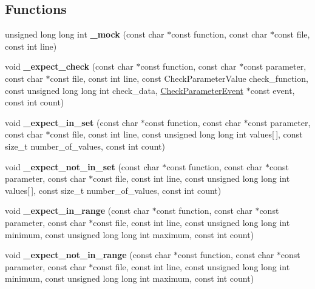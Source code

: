 \subsection*{Functions}
\begin{DoxyCompactItemize}
\item 
\mbox{\label{group__cmocka_ga80c706050fc2d841dbc8551b432c13a4}} 
unsigned long long int {\bfseries \+\_\+mock} (const char $\ast$const function, const char $\ast$const file, const int line)
\item 
\mbox{\label{group__cmocka_gaeeca1a8b7e109e06eaa43df8ee4c81f6}} 
void {\bfseries \+\_\+expect\+\_\+check} (const char $\ast$const function, const char $\ast$const parameter, const char $\ast$const file, const int line, const Check\+Parameter\+Value check\+\_\+function, const unsigned long long int check\+\_\+data, \hyperlink{structCheckParameterEvent}{Check\+Parameter\+Event} $\ast$const event, const int count)
\item 
\mbox{\label{group__cmocka_gaff6744f4577f587d0353d4ce9560cd14}} 
void {\bfseries \+\_\+expect\+\_\+in\+\_\+set} (const char $\ast$const function, const char $\ast$const parameter, const char $\ast$const file, const int line, const unsigned long long int values\mbox{[}$\,$\mbox{]}, const size\+\_\+t number\+\_\+of\+\_\+values, const int count)
\item 
\mbox{\label{group__cmocka_gad5da281ce0c6b2673acacc98c3084f3d}} 
void {\bfseries \+\_\+expect\+\_\+not\+\_\+in\+\_\+set} (const char $\ast$const function, const char $\ast$const parameter, const char $\ast$const file, const int line, const unsigned long long int values\mbox{[}$\,$\mbox{]}, const size\+\_\+t number\+\_\+of\+\_\+values, const int count)
\item 
\mbox{\label{group__cmocka_ga826f863657e3d9cf422409ad7c18e6e2}} 
void {\bfseries \+\_\+expect\+\_\+in\+\_\+range} (const char $\ast$const function, const char $\ast$const parameter, const char $\ast$const file, const int line, const unsigned long long int minimum, const unsigned long long int maximum, const int count)
\item 
\mbox{\label{group__cmocka_ga719bb657d94eb2e14c017d4402bac544}} 
void {\bfseries \+\_\+expect\+\_\+not\+\_\+in\+\_\+range} (const char $\ast$const function, const char $\ast$const parameter, const char $\ast$const file, const int line, const unsigned long long int minimum, const unsigned long long int maximum, const int count)

\end{DoxyCompactItemize}
